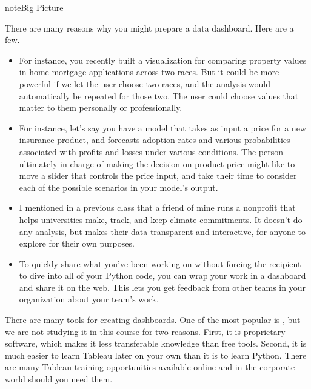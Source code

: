 \documentclass[letterpaper,10pt,english]{sphinxmanual}
\begin{document}
\begin{sphinxadmonition}{note}{Big Picture}

There are many reasons why you might prepare a data dashboard.  Here are a few.
\begin{itemize}
\item {} 
  For instance, you recently built a visualization for comparing property values in home mortgage applications across two races.  But it could be more powerful if we let the user choose two races, and the analysis would automatically be repeated for those two.  The user could choose values that matter to them personally or professionally.

\item {} 
  For instance, let’s say you have a model that takes as input a price for a new insurance product, and forecasts adoption rates and various probabilities associated with profits and losses under various conditions.  The person ultimately in charge of making the decision on product price might like to move a slider that controls the price input, and take their time to consider each of the possible scenarios in your model’s output.

\item {} 
  I mentioned in a previous class that a friend of mine runs a nonprofit that helps universities make, track, and keep climate commitments.    It doesn’t do any analysis, but makes their data transparent and interactive, for anyone to explore for their own purposes.

\item {} 
  To quickly share what you’ve been working on without forcing the recipient to dive into all of your Python code, you can wrap your work in a dashboard and share it on the web.  This lets you get feedback from other teams in your organization about your team’s work.

\end{itemize}
\end{sphinxadmonition}

There are many tools for creating dashboards.  One of the most popular is , but we are not studying it in this course for two reasons.  First, it is proprietary software, which makes it less transferable knowledge than free tools.  Second, it is much easier to learn Tableau later on your own than it is to learn Python.  There are many Tableau training opportunities available online and in the corporate world should you need them.
\end{document}
